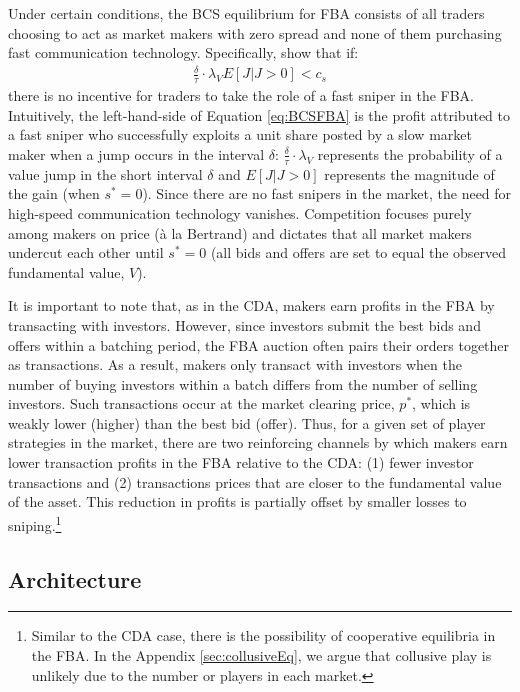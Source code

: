 \documentclass[12pt]{article}
\begin{document}
Under certain conditions, the BCS equilibrium for FBA consists of all traders choosing to act as market makers with zero spread and none of them purchasing fast communication technology. Specifically, \cite{Budish2015} show that if:
\begin{align} \label{eq:BCSFBA}
  \frac{\delta}{\tau} \cdot \lambda_V E\left[J | J>0\right] < c_s
\end{align}
there is no incentive for traders to take the role of a fast sniper in the FBA. Intuitively, the left-hand-side of Equation \eqref{eq:BCSFBA} is the profit attributed to a fast sniper who successfully exploits a unit share posted by a slow market maker when a jump occurs in the interval $\delta$: $\frac{\delta}{\tau} \cdot \lambda_V$ represents the probability of a value jump in the short interval $\delta$ and $E\left[J | J>0\right]$ represents the magnitude of the gain (when $s^*=0$). Since there are no fast snipers in the market, the need for high-speed communication technology vanishes.  Competition focuses purely among makers on price (à la Bertrand) and dictates that all market makers undercut each other until $s^* = 0$ (all bids and offers are set to equal the observed fundamental value, $V$). 

It is important to note that, as in the CDA, makers earn profits in the FBA by transacting with investors. However, since investors submit the best bids and offers within a batching period, the FBA auction often pairs their orders together as transactions. As a result, makers only transact with investors when the number of buying investors within a batch differs from the number of selling investors. Such transactions occur at the market clearing price, $p^*$, which is weakly lower (higher) than  the best bid (offer). Thus, for a given set of player strategies in the market, there are two reinforcing channels by which makers earn lower transaction profits in the FBA relative to the CDA: (1) fewer investor transactions and (2) transactions prices that are closer to the fundamental value of the asset. This reduction in profits is partially offset by smaller losses to sniping.\footnote{Similar to the CDA case, there is the possibility of cooperative equilibria in the FBA. In the Appendix \ref{sec:collusiveEq}, we argue that collusive play is unlikely due to the number or players in each market.}

\subsection{Architecture}
\end{document}
